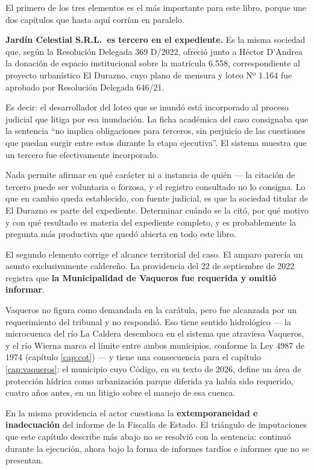 \begin{cautela}
El primero de los tres elementos es el más importante para este libro, porque une dos capítulos que hasta aquí corrían en paralelo.

\textbf{Jardín Celestial S.R.L.\ es tercero en el expediente.} Es la misma sociedad que, según la Resolución Delegada 369 D/2022, ofreció junto a Héctor D'Andrea la donación de espacio institucional sobre la matrícula 6.558, correspondiente al proyecto urbanístico El Durazno, cuyo plano de mensura y loteo Nº 1.164 fue aprobado por Resolución Delegada 646/21.

Es decir: el desarrollador del loteo que se inundó está incorporado al proceso judicial que litiga por esa inundación. La ficha académica del caso consignaba que la sentencia ``no implica obligaciones para terceros, sin perjuicio de las cuestiones que puedan surgir entre estos durante la etapa ejecutiva''. El sistema muestra que un tercero fue efectivamente incorporado.

Nada permite afirmar en qué carácter ni a instancia de quién --- la citación de tercero puede ser voluntaria o forzosa, y el registro consultado no lo consigna. Lo que en cambio queda establecido, con fuente judicial, es que la sociedad titular de El Durazno es parte del expediente. Determinar cuándo se la citó, por qué motivo y con qué resultado es materia del expediente completo, y es probablemente la pregunta más productiva que quedó abierta en todo este libro.
\end{cautela}

El segundo elemento corrige el alcance territorial del caso. El amparo parecía un asunto exclusivamente caldereño. La providencia del 22 de septiembre de 2022 registra que \textbf{la Municipalidad de Vaqueros fue requerida y omitió informar}.

Vaqueros no figura como demandada en la carátula, pero fue alcanzada por un requerimiento del tribunal y no respondió. Eso tiene sentido hidrológico --- la microcuenca del río La Caldera desemboca en el sistema que atraviesa Vaqueros, y el río Wierna marca el límite entre ambos municipios, conforme la Ley 4987 de 1974 (capítulo \ref{cap:cot}) --- y tiene una consecuencia para el capítulo \ref{cap:vaqueros}: el municipio cuyo Código, en su texto de 2026, define un área de protección hídrica como urbanización parque diferida ya había sido requerido, cuatro años antes, en un litigio sobre el manejo de esa cuenca.

En la misma providencia el actor cuestiona la \textbf{extemporaneidad e inadecuación} del informe de la Fiscalía de Estado. El triángulo de imputaciones que este capítulo describe más abajo no se resolvió con la sentencia: continuó durante la ejecución, ahora bajo la forma de informes tardíos e informes que no se presentan.

